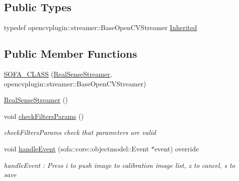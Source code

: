 \subsection*{Public Types}
\begin{DoxyCompactItemize}
\item 
typedef opencvplugin\+::streamer\+::\+Base\+Open\+C\+V\+Streamer \hyperlink{classsofa_1_1rgbdtracking_1_1_real_sense_streamer_a5f9ea54db5ca5e9cbbda378e0a93e07b}{Inherited}
\end{DoxyCompactItemize}
\subsection*{Public Member Functions}
\begin{DoxyCompactItemize}
\item 
\hyperlink{classsofa_1_1rgbdtracking_1_1_real_sense_streamer_af9aacabd087d62ddcc436b9012d70e49}{S\+O\+F\+A\+\_\+\+C\+L\+A\+SS} (\hyperlink{classsofa_1_1rgbdtracking_1_1_real_sense_streamer}{Real\+Sense\+Streamer}, opencvplugin\+::streamer\+::\+Base\+Open\+C\+V\+Streamer)
\item 
\hyperlink{classsofa_1_1rgbdtracking_1_1_real_sense_streamer_ad5406001a02420d0ae52df7529bc0929}{Real\+Sense\+Streamer} ()
\item 
void \hyperlink{classsofa_1_1rgbdtracking_1_1_real_sense_streamer_aac9f0bde89d30d6210c573b9c3fa8aad}{check\+Filters\+Params} ()
\begin{DoxyCompactList}\small\item\em check\+Filters\+Params check that parameters are valid \end{DoxyCompactList}\item 
void \hyperlink{classsofa_1_1rgbdtracking_1_1_real_sense_streamer_a3881452d7c26ef825640220be00fd034}{handle\+Event} (sofa\+::core\+::objectmodel\+::\+Event $\ast$event) override
\begin{DoxyCompactList}\small\item\em handle\+Event \+: Press i to push image to calibration image list, z to cancel, s to save \end{DoxyCompactList}\end{DoxyCompactItemize}
